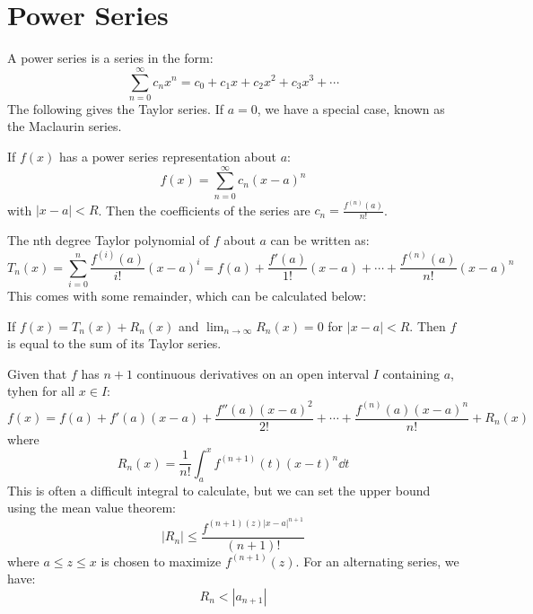 \documentclass{article}
\begin{document}
    \section{Power Series}
    A power series is a series in the form:
        \begin{equation}
            \sum_{n=0}^\infty c_n x^n = c_0 + c_1x+c_2x^2+c_3x^3 + \cdots
        \end{equation}
        The following gives the Taylor series. If $a=0$, we have a special case, known as the Maclaurin series.
        \begin{theorem}
            If $f(x)$ has a power series representation about $a$:
            \begin{equation}
                f(x)= \sum_{n=0}^\infty c_n (x-a)^n
            \end{equation}
            with $|x-a|<R$. Then the coefficients of the series are $c_n = \frac{f^{(n)}(a)}{n!}$.
        \end{theorem}
        The nth degree Taylor polynomial of $f$ about $a$ can be written as:
        \begin{equation}
            T_n(x) = \sum_{i=0}^n \frac{f^{(i)}(a)}{i!}(x-a)^i = f(a) + \frac{f'(a)}{1!}(x-a)+\cdots + \frac{f^{(n)}(a)}{n!}(x-a)^n
        \end{equation}
        This comes with some remainder, which can be calculated below:
        \begin{theorem}
            If $f(x)=T_n(x)+R_n(x)$ and $\lim_{n\to\infty} R_n(x)=0$ for $|x-a|<R$. Then $f$ is equal to the sum of its Taylor series.
            \vspace{2mm}
    
            Given that $f$ has $n+1$ continuous derivatives on an open interval $I$ containing $a$, tyhen for all $x\in I$:
            \begin{equation}
                f(x) = f(a)+f'(a)(x-a)+\frac{f''(a)(x-a)^2}{2!}+\cdots + \frac{f^{(n)}(a)(x-a)^n}{n!}+R_n(x)
            \end{equation}
            where
            \begin{equation}
                R_n(x) = \frac{1}{n!}\int_a^x f^{(n+1)}(t)(x-t)^n \dd{t}
            \end{equation}
            This is often a difficult integral to calculate, but we can set the upper bound using the mean value theorem:
            \begin{equation}
                |R_n| \le \frac{f^{(n+1)(z)|x-a|^{n+1}}}{(n+1)!}
            \end{equation}
            where $a \le z \le x$ is chosen to maximize $f^{(n+1)}(z)$. For an alternating series, we have:
            \begin{equation}
                R_n < |a_{n+1}|
            \end{equation}
        \end{theorem}
\end{document}

